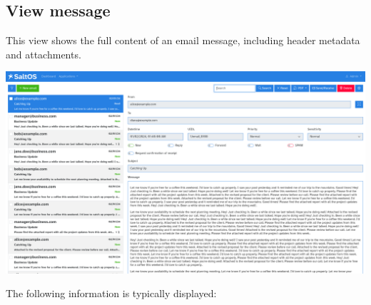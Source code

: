 \documentclass[a4paper]{article}
\begin{document}
\hypertarget{toc93}{}
\subsection{View message}

This view shows the full content of an email message, including header metadata and attachments.

\begin{center}\includegraphics[width=1\textwidth]{../ujest/snaps/test-screenshots-js-screenshots-emails-emails-view-100-en-us-1-snap.png}\end{center}

The following information is typically displayed:
\end{document}
